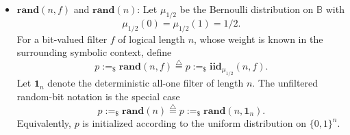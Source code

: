 \documentclass[acmsmall,screen,review,anonymous,nonacm]{acmart}
\theoremstyle{defn_style}
\begin{document}
\begin{itemize}
    and let
    \[
    r_1<\cdots<r_{n-m}
    \]
    enumerate the ordered complement
    \[
    \{1,\ldots,n\}\setminus\{i_0,\ldots,i_{m-1}\}.
    \]
    Then
    \[
    \begin{aligned}
    p:=_{\$}\mathbf{iid}_{\mu}(n,f)
    \stackrel{\triangle}{=}\;&
    i_0:=\mathbf{find~index}(f,1);\
    i_1:=\mathbf{find~index}(f,i_0+1);\
    \cdots;\
    i_{m-1}:=\mathbf{find~index}(f,i_{m-2}+1);\\
    &
    p[i_0]:=_{\$}\mathbf{Coin\mbox{-}flip}_{\mu};\
    p[i_1]:=_{\$}\mathbf{Coin\mbox{-}flip}_{\mu};\
    \cdots;\
    p[i_{m-1}]:=_{\$}\mathbf{Coin\mbox{-}flip}_{\mu};\\
    &
    p[r_1]:=_{\$}\mathbf{Coin\mbox{-}flip}_{\mu};\
    p[r_2]:=_{\$}\mathbf{Coin\mbox{-}flip}_{\mu};\
    \cdots;\
    p[r_{n-m}]:=_{\$}\mathbf{Coin\mbox{-}flip}_{\mu}.
    \end{aligned}
    \]
    Here \(i_0,\ldots,i_{m-1}\) are fresh \(\mathsf{Int}\)-typed index
    variables, and
    \(p[t]:=_{\$}\mathbf{Coin\mbox{-}flip}_{\mu}\)
    denotes the primitive coin-flip command with coin distribution
    \(\mu.\)

    The notation
    \[
    r_1<\cdots<r_{n-m}
    \]
    is an ordered-complement notation over the same symbolic filter \(f\). It
    does not introduce proof-time case analysis over stored filter values and
    does not introduce runtime scanning beyond the displayed
    \(\mathbf{find~index}\) assignments.

    \textcolor{red}{The filter in this iid syntax sugar schedules only the displayed finite sequence of coin-flip assignments.}

    Let \(\mathbf 1_n\) denote the deterministic all-one filter of length
    \(n\). The unfiltered iid notation is the special case
    \[
    p:=_{\$}\mathbf{iid}_{\mu}(n)
    \stackrel{\triangle}{=}
    p:=_{\$}\mathbf{iid}_{\mu}(n,\mathbf 1_n).
    \]

    \item \(\mathbf{rand}(n,f)\) and \(\mathbf{rand}(n)\):
    Let \(\mu_{1/2}\) be the Bernoulli distribution on \(\mathbb B\) with
    \[
    \mu_{1/2}(0)=\mu_{1/2}(1)=1/2.
    \]
    For a bit-valued filter \(f\) of logical length \(n\), whose weight is
    known in the surrounding symbolic context, define
    \[
    p:=_{\$}\mathbf{rand}(n,f)
    \stackrel{\triangle}{=}
    p:=_{\$}\mathbf{iid}_{\mu_{1/2}}(n,f).
    \]
    Let \(\mathbf 1_n\) denote the deterministic all-one filter of length
    \(n\). The unfiltered random-bit notation is the special case
    \[
    p:=_{\$}\mathbf{rand}(n)
    \stackrel{\triangle}{=}
    p:=_{\$}\mathbf{rand}(n,\mathbf 1_n).
    \]
    Equivalently, \(p\) is initialized according to the uniform distribution
    on \(\{0,1\}^{n}\).


\end{itemize}
\end{document}
